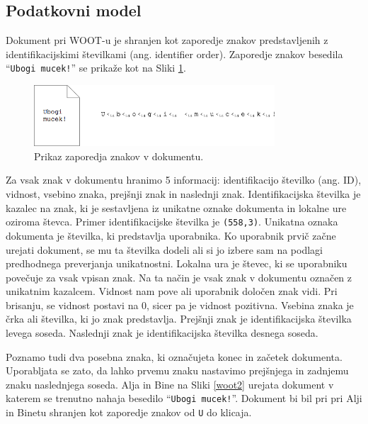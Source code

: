 \documentclass[a4paper, 12pt, twoside]{book}
\begin{document}
\subsection{Podatkovni model}

Dokument pri WOOT-u je shranjen kot zaporedje znakov predstavljenih z identifikacijskimi številkami (ang. identifier order). Zaporedje znakov besedila “{\tt Ubogi mucek!}” se prikaže kot na Sliki \ref{woot1}.

\begin{figure}[placement h]
\begin{center}
\includegraphics[width=9cm]{woot1.png}
\end{center}
\caption{Prikaz zaporedja znakov v dokumentu.}
\label{woot1}
\end{figure}

Za vsak znak v dokumentu hranimo 5 informacij: identifikacijo številko (ang. ID), vidnost, vsebino znaka, prejšnji znak in naslednji znak. Identifikacijska številka je kazalec na znak, ki je sestavljena iz unikatne oznake dokumenta in lokalne ure oziroma števca. Primer identifikacijske številka je {\tt (558,3)}. Unikatna oznaka dokumenta je številka, ki predstavlja uporabnika. Ko uporabnik prvič začne urejati dokument, se mu ta številka dodeli ali si jo izbere sam na podlagi predhodnega preverjanja unikatnostni. Lokalna ura je števec, ki se uporabniku povečuje za vsak vpisan znak. Na ta način je vsak znak v dokumentu označen z unikatnim kazalcem. Vidnost nam pove ali uporabnik določen znak vidi. Pri brisanju, se vidnost postavi na 0, sicer pa je vidnost pozitivna. Vsebina znaka je črka ali številka, ki jo znak predstavlja. Prejšnji znak je identifikacijska številka levega soseda. Naslednji znak je identifikacijska številka desnega soseda.

Poznamo tudi dva posebna znaka, ki označujeta konec in začetek dokumenta. Uporabljata se zato, da lahko prvemu znaku nastavimo prejšnjega in zadnjemu znaku naslednjega soseda. Alja in Bine na Sliki \ref{woot2} urejata dokument v katerem se trenutno nahaja besedilo “{\tt Ubogi mucek!}”. Dokument bi bil pri pri Alji in Binetu shranjen kot zaporedje znakov od {\tt U} do klicaja.
\end{document}
